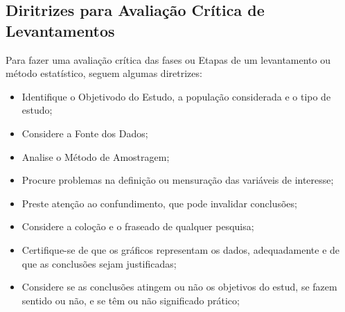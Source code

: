 \subsection{Diritrizes para Avaliação Crítica de Levantamentos}

\inic Para  fazer uma avaliação crítica das fases ou Etapas de um levantamento ou método estatístico, seguem algumas diretrizes:

\begin{itemize}
    \item Identifique o Objetivodo do Estudo, a população considerada e o tipo de estudo;
    \item Considere a Fonte dos Dados;
    \item Analise o Método de Amostragem;
    \item Procure problemas na definição ou mensuração das variáveis de interesse;
    \item Preste atenção ao confundimento, que pode invalidar conclusões;
    \item Considere a coloção e o fraseado de qualquer pesquisa;
    \item Certifique-se de que os gráficos representam os dados, adequadamente e de que as conclusões sejam justificadas;
    \item Considere se as conclusões atingem ou não os objetivos do estud, se fazem sentido ou não, e se têm ou não significado prático;
\end{itemize}








